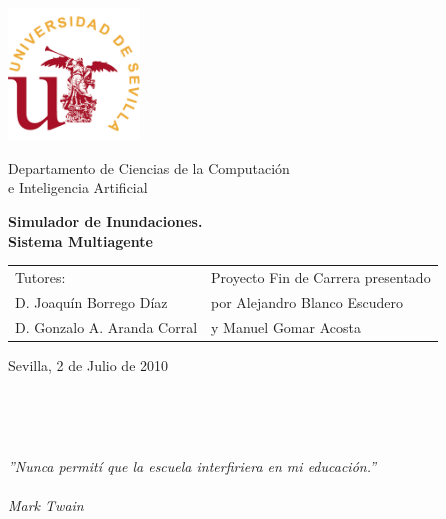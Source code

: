 \thispagestyle{empty}

{
\thispagestyle{empty}
\begin{center}
\includegraphics[width=35mm]{figuras/titulo/logous.png}
\end{center}
\vspace*{0cm}
\Large
\begin{center}
{\normalsize \sc
Departamento de Ciencias de la Computación \\ e Inteligencia Artificial \\}

\end{center}

\vspace{0.5cm}

\LARGE

\begin{center}
{\bf Simulador de Inundaciones. \\ Sistema Multiagente}
\end{center}

\normalsize

\vspace{75mm}

\begin{tabular}{ll}
  Tutores: \hspace{5cm} & Proyecto Fin de Carrera presentado\\
  D. Joaquín Borrego Díaz & por Alejandro Blanco Escudero\\
  D. Gonzalo A. Aranda Corral & y Manuel Gomar Acosta \\
\end{tabular}

\vspace{1cm}

Sevilla, 2 de Julio de 2010

\newpage
\thispagestyle{empty}
\mbox{ }
\newpage
\thispagestyle{empty}

\newpage
\thispagestyle{empty}

\mbox{ }

\vfill

\begin{flushright}
\begin{minipage}{9cm}
\em{''Nunca permití que la escuela interfiriera en mi educación.''}\\ \\
Mark Twain
\end{minipage}
\end{flushright}

\vfill

\newpage
\thispagestyle{empty}
\mbox{ }

}